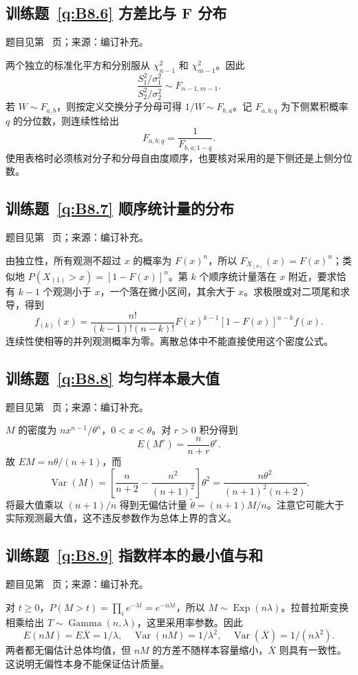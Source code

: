 \subsection*{训练题~\ref{q:B8.6} 方差比与 F 分布}\label{a:B8.6}{\small 题目见第~\pageref{q:B8.6} 页；来源：编订补充。}
\begin{solve}两个独立的标准化平方和分别服从 $\chi^2_{n-1}$ 和 $\chi^2_{m-1}$。因此\[\frac{S_1^2/\sigma_1^2}{S_2^2/\sigma_2^2}\sim F_{n-1,m-1}.\]若 $W\sim F_{a,b}$，则按定义交换分子分母可得 $1/W\sim F_{b,a}$。记 $F_{a,b;q}$ 为下侧累积概率 $q$ 的分位数，则连续性给出\[F_{a,b;q}=\frac{1}{F_{b,a;1-q}}.\]使用表格时必须核对分子和分母自由度顺序，也要核对采用的是下侧还是上侧分位数。\end{solve}

\subsection*{训练题~\ref{q:B8.7} 顺序统计量的分布}\label{a:B8.7}{\small 题目见第~\pageref{q:B8.7} 页；来源：编订补充。}
\begin{solve}由独立性，所有观测不超过 $x$ 的概率为 $F(x)^n$，所以 $F_{X_{(n)}}(x)=F(x)^n$；类似地 $P(X_{(1)}>x)=[1-F(x)]^n$。第 $k$ 个顺序统计量落在 $x$ 附近，要求恰有 $k-1$ 个观测小于 $x$，一个落在微小区间，其余大于 $x$。求极限或对二项尾和求导，得到\[f_{(k)}(x)=\frac{n!}{(k-1)!(n-k)!}F(x)^{k-1}[1-F(x)]^{n-k}f(x).\]连续性使相等的并列观测概率为零。离散总体中不能直接使用这个密度公式。\end{solve}

\subsection*{训练题~\ref{q:B8.8} 均匀样本最大值}\label{a:B8.8}{\small 题目见第~\pageref{q:B8.8} 页；来源：编订补充。}
\begin{solve}$M$ 的密度为 $nx^{n-1}/\theta^n$，$0<x<\theta$。对 $r>0$ 积分得到\[E(M^r)=\frac{n}{n+r}\theta^r.\]故 $EM=n\theta/(n+1)$，而\[\operatorname{Var}(M)=\left[\frac{n}{n+2}-\frac{n^2}{(n+1)^2}\right]\theta^2=\frac{n\theta^2}{(n+1)^2(n+2)}.\]将最大值乘以 $(n+1)/n$ 得到无偏估计量 $\widetilde\theta=(n+1)M/n$。注意它可能大于实际观测最大值，这不违反参数作为总体上界的含义。\end{solve}

\subsection*{训练题~\ref{q:B8.9} 指数样本的最小值与和}\label{a:B8.9}{\small 题目见第~\pageref{q:B8.9} 页；来源：编订补充。}
\begin{solve}对 $t\ge0$，$P(M>t)=\prod_i e^{-\lambda t}=e^{-n\lambda t}$，所以 $M\sim\operatorname{Exp}(n\lambda)$。拉普拉斯变换相乘给出 $T\sim\operatorname{Gamma}(n,\lambda)$，这里采用率参数。因此\[E(nM)=E\overline X=1/\lambda,\quad\operatorname{Var}(nM)=1/\lambda^2,\quad\operatorname{Var}(\overline X)=1/(n\lambda^2).\]两者都无偏估计总体均值，但 $nM$ 的方差不随样本容量缩小，$\overline X$ 则具有一致性。这说明无偏性本身不能保证估计质量。\end{solve}

